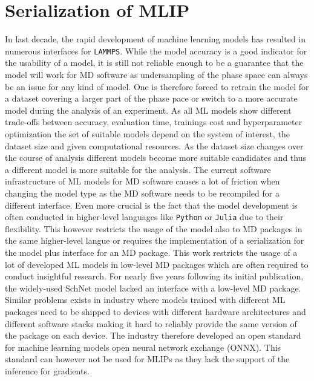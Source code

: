 \section{Serialization of MLIP}
In last decade, the rapid development of machine learning models has resulted in numerous interfaces for \texttt{LAMMPS}\cite{QUIP}. %
While the model accuracy is a good indicator for the usability of a model, it is still not reliable enough to be a guarantee that the model will work for MD software as undersampling of the phase space can always be an issue for any kind of model.
One is therefore forced to retrain the model for a dataset covering a larger part of the phase pace or switch to a more accurate model during the analysis of an experiment.
As all ML models show different trade-offs between accuracy, evaluation time, trainings cost and hyperparameter optimization the set of suitable models depend on the system of interest, the dataset size and given computational resources.
As the dataset size changes over the course of analysis different models become more suitable candidates and thus a different model is more suitable for the analysis.
The current software infrastructure of ML models for MD software causes a lot of friction when changing the model type as the MD software needs to be recompiled for a different interface.%
Even more crucial is the fact that the model development is often conducted in higher-level languages like \texttt{Python} or \texttt{Julia} due to their flexibility.
This however restricts the usage of the model also to MD packages in the same higher-level langue or requires the implementation of a serialization for the model plus interface for an MD package.
This work restricts the usage of a lot of developed ML models in low-level MD packages which are often required to conduct insightful research.
For nearly five years following its initial publication, the widely-used SchNet model\cite{schu+18jcp} lacked an interface with a low-level MD package.
Similar problems exists in industry where models trained with different ML packages need to be shipped to devices with different hardware architectures and different software stacks making it hard to reliably provide the same version of the package on each device.
The industry therefore developed an open standard for machine learning models open neural network exchange (ONNX).
This standard can however not be used for MLIPs as they lack the support of the inference for gradients.

